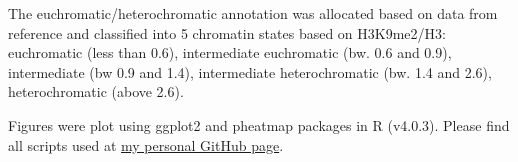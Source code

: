 The euchromatic/heterochromatic annotation was allocated based on data from reference \cite{RN183} and classified into 5 chromatin states based on H3K9me2/H3: euchromatic (less than 0.6), intermediate euchromatic (bw. 0.6 and 0.9), intermediate (bw 0.9 and 1.4), intermediate heterochromatic (bw. 1.4 and 2.6), heterochromatic (above 2.6). 

 Figures were plot using ggplot2 and pheatmap packages in R (v4.0.3). Please find all scripts used at \href{https://github.com/talasjudit}{my personal GitHub page}.

